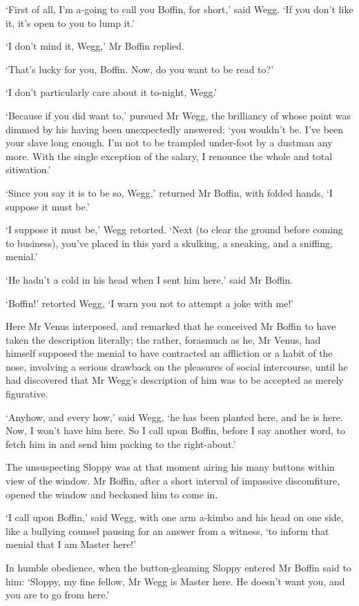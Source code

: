 ‘First of all, I’m a-going to call you Boffin, for short,’ said Wegg.
‘If you don’t like it, it’s open to you to lump it.’

‘I don’t mind it, Wegg,’ Mr Boffin replied.

‘That’s lucky for you, Boffin. Now, do you want to be read to?’

‘I don’t particularly care about it to-night, Wegg.’

‘Because if you did want to,’ pursued Mr Wegg, the brilliancy of whose
point was dimmed by his having been unexpectedly answered: ‘you wouldn’t
be. I’ve been your slave long enough. I’m not to be trampled under-foot
by a dustman any more. With the single exception of the salary, I
renounce the whole and total sitiwation.’

‘Since you say it is to be so, Wegg,’ returned Mr Boffin, with folded
hands, ‘I suppose it must be.’

‘I suppose it must be,’ Wegg retorted. ‘Next (to clear the ground before
coming to business), you’ve placed in this yard a skulking, a sneaking,
and a sniffing, menial.’

‘He hadn’t a cold in his head when I sent him here,’ said Mr Boffin.

‘Boffin!’ retorted Wegg, ‘I warn you not to attempt a joke with me!’

Here Mr Venus interposed, and remarked that he conceived Mr Boffin to
have taken the description literally; the rather, forasmuch as he, Mr
Venus, had himself supposed the menial to have contracted an affliction
or a habit of the nose, involving a serious drawback on the pleasures of
social intercourse, until he had discovered that Mr Wegg’s description
of him was to be accepted as merely figurative.

‘Anyhow, and every how,’ said Wegg, ‘he has been planted here, and he
is here. Now, I won’t have him here. So I call upon Boffin, before I say
another word, to fetch him in and send him packing to the right-about.’

The unsuspecting Sloppy was at that moment airing his many buttons
within view of the window. Mr Boffin, after a short interval of
impassive discomfiture, opened the window and beckoned him to come in.

‘I call upon Boffin,’ said Wegg, with one arm a-kimbo and his head on
one side, like a bullying counsel pausing for an answer from a witness,
‘to inform that menial that I am Master here!’

In humble obedience, when the button-gleaming Sloppy entered Mr Boffin
said to him: ‘Sloppy, my fine fellow, Mr Wegg is Master here. He doesn’t
want you, and you are to go from here.’

